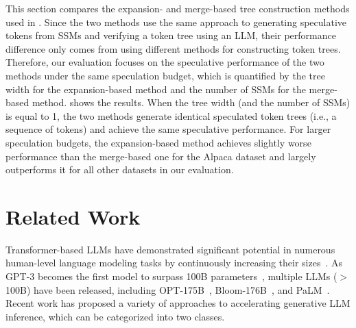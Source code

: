 This section compares the expansion- and merge-based tree construction methods used in \SpecInfer.
Since the two methods use the same approach to generating speculative tokens from SSMs and verifying a token tree using an LLM, their performance difference only comes from using different methods for constructing token trees.
Therefore, our evaluation focuses on the speculative performance of the two methods under the same speculation budget, which is quantified by the tree width for the expansion-based method and the number of SSMs for the merge-based method.
 shows the results.
When the tree width (and the number of SSMs) is equal to 1, the two methods generate identical speculated token trees (i.e., a sequence of tokens) and achieve the same speculative performance.
For larger speculation budgets, the expansion-based method achieves slightly worse performance than the merge-based one for the Alpaca dataset and largely outperforms it for all other datasets in our evaluation.


\section{Related Work}
\label{specinfer:sec:related}

Transformer-based LLMs have demonstrated significant potential in numerous human-level language modeling tasks by continuously increasing their sizes~\cite{vaswani,rae2021scaling,smith2022using,du2022glam,chowdhery2022palm}.
As GPT-3 becomes the first model to surpass 100B parameters~\cite{brown2020language}, multiple LLMs ($>$100B) have been released, including OPT-175B~\cite{zhang2022opt}, Bloom-176B~\cite{scao2022bloom}, and PaLM~\cite{chowdhery2022palm}.
Recent work has proposed a variety of approaches to accelerating generative LLM inference, which can be categorized into two classes.

